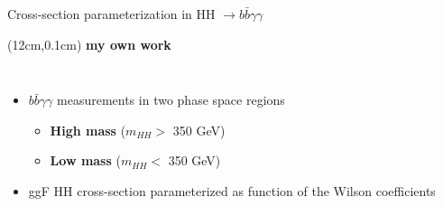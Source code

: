 \begin{frame}{Cross-section parameterization in HH $\to b\bar{b}\gamma\gamma$}

\begin{textblock*}{5cm}(12cm,0.1cm) %
   \textcolor{HHred}{\Large\textbf{my own work}}
\end{textblock*}
\begin{columns}

\begin{itemize}
    \item $b\bar{b}\gamma\gamma$ measurements in two phase space regions
    \begin{itemize}
        \item \textcolor{HHred}{\textbf{High mass}} ($m_{HH} > $ 350 GeV) 
        \item \textcolor{HHturquoise_d}{\textbf{Low mass}} ($m_{HH} < $ 350 GeV)
    \end{itemize}
    \item ggF HH cross-section parameterized as function of the Wilson coefficients
\end{itemize}




\end{columns}
\end{frame}
